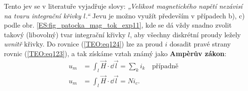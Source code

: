         Tento jev se v literatuře vyjadřuje slovy: \emph{„Velikost magnetického napětí nezávisí na 
        tvaru integrační křivky \(l\).“} Jevu je možno využít především v případech b), c) podle 
        obr. \ref{ES:fig_patocka_mag_tok_exp11}, kde se dá vždy snadno zvolit takový (libovolný) 
        tvar integrační křivky \(l\), aby všechny diskrétní proudy ležely \emph{uvnitř} křivky. Do 
        rovnice (\ref{TEO:eq124}) lze za proud \(i\) dosadit pravé strany rovnic 
        (\ref{TEO:eq123}), a tak získáme vztah známý jako \textbf{Ampèrův zákon}:
        \begin{align*}
          u_m &= \int_l \vec{H}\cdot \dd{\vec{l}} =\sum_k i_k 
          \quad\text{případně}\quad                                 \\
          u_m &= \int_l \vec{H}\cdot \dd{\vec{l}} =Ni_c.           
        \end{align*}
     
